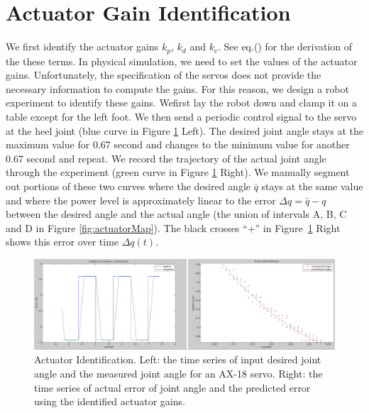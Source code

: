 \section{Actuator Gain Identification}
We first identify the actuator gains $k_p$, $k_d$ and $k_c$. See eq.() for the derivation of the these terms. In physical simulation, we need to set the values of the actuator gains. Unfortunately, the specification of the servos does not provide the necessary information to compute the gains. For this reason, we design a robot experiment to identify these gains. Wefirst lay the robot down and clamp it on a table except for the left foot. We then send a periodic control signal to the servo at the heel joint (blue curve in Figure \ref{fig:actuatorId} Left). The desired joint angle stays at the maximum value for 0.67 second and changes to the minimum value for another 0.67 second and repeat. We record the trajectory of the actual joint angle through the experiment (green curve in Figure \ref{fig:actuatorId} Right). We manually segment out portions of these two curves where the desired angle $\bar{q}$ stays at the same value and where the power level is approximately linear to the error $\Delta q = \bar{q} - q$ between the desired angle and the actual angle (the union of intervals A, B, C and D in Figure \ref{fig:actuatorMap}). The black crosses ``+'' in Figure~\ref{fig:actuatorId} Right shows this error over time $\Delta q(t)$.

\begin{figure}[!t]
  \centering
  \includegraphics[width=\textwidth]{figures/actuatorId}
  \caption{Actuator Identification. Left: the time series of input desired joint angle and the measured joint angle for an AX-18 servo. Right: the time series of actual error of joint angle and the predicted error using the identified actuator gains.  }
  \label{fig:actuatorId}
\end{figure}

